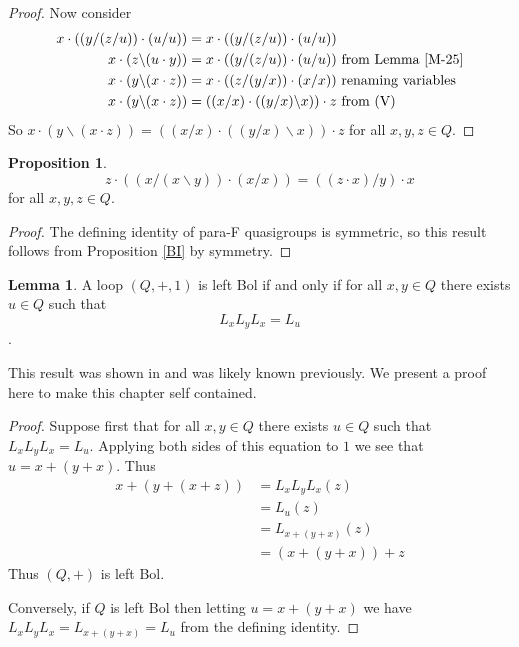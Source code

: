 \documentclass[12pt]{report}
\theoremstyle{definition}
\newtheorem{lem}[thm]{Lemma}
\newtheorem{prp}[thm]{Proposition}
\newcommand{\ldv}{\backslash}       %
\newcommand{\rdv}{/}                %
\begin{document}
\begin{proof}
  Now consider
  \begin{align*}
    x\cdot((y/(z/u))\cdot (u/u)) &= x\cdot((y/(z/u))\cdot (u/u))\\
    x\cdot(z\ldv (u\cdot y)) &= x\cdot((y/(z/u))\cdot (u/u))\text{ from Lemma \ref{M-25}}\\
    x\cdot(y\ldv (x\cdot z)) &= x\cdot((z/(y/x))\cdot (x/x))\text{ renaming variables}\\
    x\cdot(y\ldv (x\cdot z)) &= ((x/x)\cdot((y/x)\ldv x))\cdot z\text{ from (V)}
  \end{align*}
  So $x\cdot(y\ldv (x\cdot z)) = ((x/x)\cdot((y/x)\ldv x))\cdot z$ for all $x, y, z\in Q$.
\end{proof}

\begin{prp}\label{BI-dual}
  \[z\cdot((x\rdv(x\ldv y))\cdot (x\rdv x)) = ((z\cdot x)\rdv y)\cdot x\]
  for all $x, y, z\in Q$.
\end{prp}

\begin{proof}
  The defining identity of para-F quasigroups is symmetric, so this result follows from Proposition \ref{BI}
    by symmetry.
\end{proof}

\begin{lem}\label{bol-char}
  A loop $(Q, +, 1)$ is left Bol if and only if for all $x, y\in Q$ there exists $u \in Q$ such that 
  \[L_x L_y L_x = L_u\] \cite{BK-isotopes}.
\end{lem}

This result was shown in \cite{BK-isotopes} and was likely known previously. We present a proof here to
  make this chapter self contained.

\begin{proof}
  Suppose first that for all $x, y \in Q$ there exists $u\in Q$ such that $L_x L_y L_x = L_u$. Applying
    both sides of this equation to $1$ we see that $u = x + (y + x)$. Thus
  \begin{align*}
    x + (y + (x + z)) &= L_x L_y L_x(z)\\
    &= L_u(z)\\
    &= L_{x + (y + x)}(z)\\
    &= (x + (y + x)) + z
  \end{align*}
  Thus $(Q, +)$ is left Bol.

  Conversely, if $Q$ is left Bol then letting $u = x + (y + x)$ we
    have $L_x L_y L_x = L_{x + (y + x)} = L_u$ from the defining identity.
\end{proof}
\end{document}
